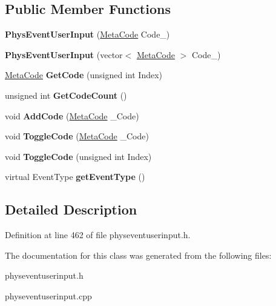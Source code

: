 \subsection*{Public Member Functions}
\begin{DoxyCompactItemize}
\item 
\hypertarget{classPhysEventUserInput_a218bec21fe49efcba82f3480e2386968}{
{\bfseries PhysEventUserInput} (\hyperlink{classMetaCode}{MetaCode} Code\_\-)}
\label{dc/d0e/classPhysEventUserInput_a218bec21fe49efcba82f3480e2386968}

\item 
\hypertarget{classPhysEventUserInput_ab9451ee5b385a3c575922ec7cfa07747}{
{\bfseries PhysEventUserInput} (vector$<$ \hyperlink{classMetaCode}{MetaCode} $>$ Code\_\-)}
\label{dc/d0e/classPhysEventUserInput_ab9451ee5b385a3c575922ec7cfa07747}

\item 
\hypertarget{classPhysEventUserInput_a590b347fcd5db7a48fc460b1ed538e4f}{
\hyperlink{classMetaCode}{MetaCode} {\bfseries GetCode} (unsigned int Index)}
\label{dc/d0e/classPhysEventUserInput_a590b347fcd5db7a48fc460b1ed538e4f}

\item 
\hypertarget{classPhysEventUserInput_a8232572283b9dc85c96a2b28479123a8}{
unsigned int {\bfseries GetCodeCount} ()}
\label{dc/d0e/classPhysEventUserInput_a8232572283b9dc85c96a2b28479123a8}

\item 
\hypertarget{classPhysEventUserInput_a2b30cdf2aedb70940b85bb9e4665230f}{
void {\bfseries AddCode} (\hyperlink{classMetaCode}{MetaCode} \_\-Code)}
\label{dc/d0e/classPhysEventUserInput_a2b30cdf2aedb70940b85bb9e4665230f}

\item 
\hypertarget{classPhysEventUserInput_a4d95c43110ac7023c5da208c14db565f}{
void {\bfseries ToggleCode} (\hyperlink{classMetaCode}{MetaCode} \_\-Code)}
\label{dc/d0e/classPhysEventUserInput_a4d95c43110ac7023c5da208c14db565f}

\item 
\hypertarget{classPhysEventUserInput_a1bf30bbab980fd0beee52509bdb4a2ad}{
void {\bfseries ToggleCode} (unsigned int Index)}
\label{dc/d0e/classPhysEventUserInput_a1bf30bbab980fd0beee52509bdb4a2ad}

\item 
\hypertarget{classPhysEventUserInput_a7adabb15e8012a86c9da1910033eea4b}{
virtual EventType {\bfseries getEventType} ()}
\label{dc/d0e/classPhysEventUserInput_a7adabb15e8012a86c9da1910033eea4b}

\end{DoxyCompactItemize}


\subsection{Detailed Description}


Definition at line 462 of file physeventuserinput.h.

The documentation for this class was generated from the following files:\begin{DoxyCompactItemize}
\item 
physeventuserinput.h\item 
physeventuserinput.cpp\end{DoxyCompactItemize}
